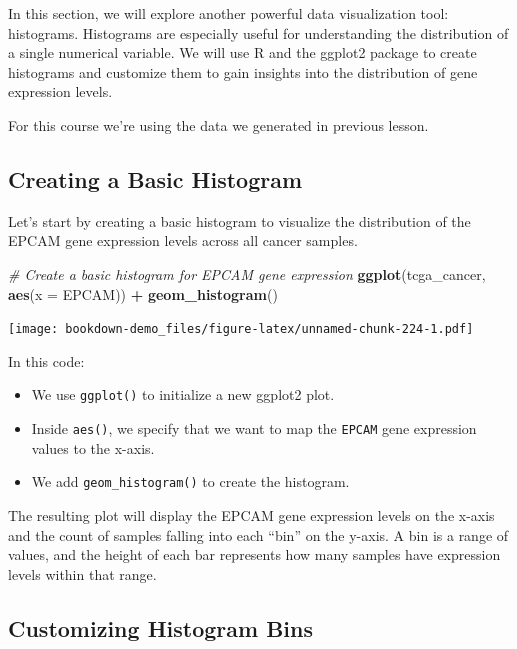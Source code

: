 \documentclass[
]{book}
\newenvironment{Shaded}{\begin{snugshade}}{\end{snugshade}}
\newcommand{\AttributeTok}[1]{\textcolor[rgb]{0.13,0.29,0.53}{#1}}
\newcommand{\CommentTok}[1]{\textcolor[rgb]{0.56,0.35,0.01}{\textit{#1}}}
\newcommand{\FunctionTok}[1]{\textcolor[rgb]{0.13,0.29,0.53}{\textbf{#1}}}
\newcommand{\NormalTok}[1]{#1}
\newcommand{\SpecialCharTok}[1]{\textcolor[rgb]{0.81,0.36,0.00}{\textbf{#1}}}
\begin{document}
In this section, we will explore another powerful data visualization tool: histograms. Histograms are especially useful for understanding the distribution of a single numerical variable. We will use R and the ggplot2 package to create histograms and customize them to gain insights into the distribution of gene expression levels.

For this course we're using the data we generated in previous lesson.

\hypertarget{creating-a-basic-histogram}{%
\subsection{Creating a Basic Histogram}\label{creating-a-basic-histogram}}

Let's start by creating a basic histogram to visualize the distribution of the EPCAM gene expression levels across all cancer samples.

\begin{Shaded}
\begin{Highlighting}[]
\CommentTok{\# Create a basic histogram for EPCAM gene expression}
\FunctionTok{ggplot}\NormalTok{(tcga\_cancer, }\FunctionTok{aes}\NormalTok{(}\AttributeTok{x =}\NormalTok{ EPCAM)) }\SpecialCharTok{+}
  \FunctionTok{geom\_histogram}\NormalTok{()}
\end{Highlighting}
\end{Shaded}

\texttt{[image: bookdown-demo\_files/figure-latex/unnamed-chunk-224-1.pdf]}

In this code:

\begin{itemize}
\item
  We use \texttt{ggplot()} to initialize a new ggplot2 plot.
\item
  Inside \texttt{aes()}, we specify that we want to map the \texttt{EPCAM} gene expression values to the x-axis.
\item
  We add \texttt{geom\_histogram()} to create the histogram.
\end{itemize}

The resulting plot will display the EPCAM gene expression levels on the x-axis and the count of samples falling into each ``bin'' on the y-axis. A bin is a range of values, and the height of each bar represents how many samples have expression levels within that range.

\hypertarget{customizing-histogram-bins}{%
\subsection{Customizing Histogram Bins}\label{customizing-histogram-bins}}
\end{document}
